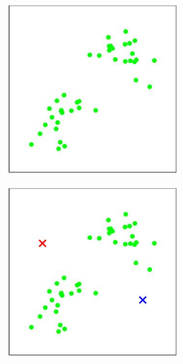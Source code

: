 \documentclass{article}
\begin{document}

\begin{figure}
  \centering
  \begin{subfigure}[b]{0.3\textwidth}
    \centering
    \includegraphics[width=\textwidth]{kmeans/kmeans1.eps}
    \caption{}
    \label{}
  \end{subfigure}
  \hfill
  \begin{subfigure}[b]{0.3\textwidth}
    \centering
    \includegraphics[width=\textwidth]{kmeans/kmeans2.eps}

\end{subfigure}
\end{figure}
\end{document}
